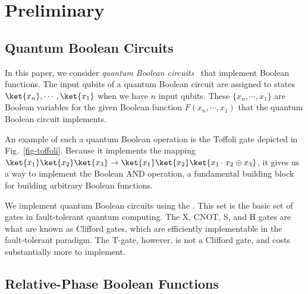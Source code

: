   
%       
\section{Preliminary}
\label{Sec:prelim}
\subsection{Quantum Boolean Circuits}

In this paper, we consider {\it quantum Boolean circuits}~\cite{bib-ddmf} that implement Boolean functions. The input qubits of a quantum Boolean circuit are assigned to states $\ket{x_n}, \cdots,\ket{x_{1}}$  when we have $n$ input qubits. These $\{x_n,\cdots,x_1\}$ are Boolean variables for the given Boolean function $F(x_n,\cdots,x_1)$ that the quantum Boolean circuit implements.

An example of such a quantum Boolean operation is the Toffoli gate depicted in
Fig.~\ref{fig-toffoli}. Because it implements the mapping $\ket{x_1}\ket{x_2}\ket{x_3} \rightarrow \ket{x_1} \ket{x_2} \ket{x_1 \cdot x_2 \oplus x_3}$, it gives us a way to implement the Boolean AND operation, a fundamental building block for building arbitrary Boolean functions.


We implement quantum Boolean circuits using the . This set is the
basic set of gates in fault-tolerant quantum computing. The X, CNOT, S, and H gates are what are known as Clifford gates, which are efficiently implementable in the fault-tolerant paradigm. The T-gate, however, is not a Clifford gate, and costs substantially more to implement.


\subsection{Relative-Phase Boolean Functions}

